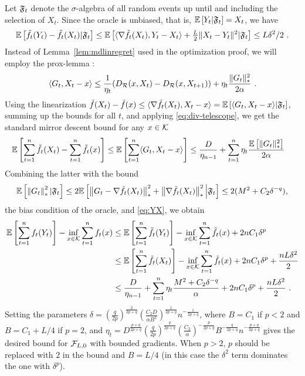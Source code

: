 Let $\mathfrak{F}_t$ denote the $\sigma$-algebra of all random events up until and including the selection of $X_t$. Since the oracle is unbiased, that is,  $\mathbb{E}\left[Y_t|\mathfrak{F}_t\right]=X_t$, we have
\begin{equation}
\mathbb{E}\left[\tilde{f}_t(Y_t)-\tilde{f}_t(X_t)|\mathfrak{F}_t\right] \le \mathbb{E}\left[\langle \nabla \tilde{f}_t(X_t),Y_t-X_t \rangle+\tfrac{L}{2}\|X_t-Y_t\|^2|\mathfrak{F}_t\right] \le L\delta^2/2~.
\label{eq:YX}
\end{equation}
Instead of Lemma~\ref{lem:mdlinregret} used in the optimization proof, we will employ the prox-lemma \citep[see, e.g.,][]{Beck2003mirror, NeJuLaSh09}:
\begin{equation}
\label{eq:proxlemma}
\langle G_t,X_t-x \rangle \le \frac{1}{\eta_t}(D_{\mathcal{R}}(x,X_t)-D_{\mathcal{R}}(x,X_{t+1})) + \eta_t \frac{\|G_t\|_*^2}{2\alpha}~.
\end{equation}
Using the linearization $\tilde{f}(X_t) - \tilde{f}(x) \le \langle \nabla \tilde{f}_t(X_t),X_t-x \rangle = \mathbb{E}\left[\langle  G_t,X_t-x \rangle| \mathfrak{F}_t\right]$, summing up the bounds for all $t$, and applying \eqref{eq:div-telescope}, we get the standard mirror descent bound for any $x \in \mathcal{K}$
\begin{align}
\mathbb{E}\left[\sum_{t=1}^n \tilde{f}_t(X_t)- \sum_{t=1}^n \tilde{f}_t(x)\right] 
& \le \mathbb{E}\left[\sum_{t=1}^n \langle G_t,X_t-x \rangle\right] 
\le \frac{D}{\eta_{n-1}} + \sum_{t=1}^n \eta_t \frac{\mathbb{E}\left[\|G_t\|_*^2\right]}{2\alpha} 
\label{eq:md-bound}
\end{align}
Combining the latter with the bound
\[
\mathbb{E}\left[\left\|G_t\right\|_*^2 | \mathfrak{F}_t\right] \le 2\mathbb{E}\left[\left\|G_t - \nabla \tilde{f}_t(X_t)\right\|_*^2 + \left\|\nabla \tilde{f}_t(X_t)\right\|_*^2 \Big| \mathfrak{F}_t\right]
\le 2(M^2 + C_2 \delta^{-q}),
\]
the bias condition of the oracle, and \eqref{eq:YX}, we obtain
\begin{align*}
\mathbb{E}\left[\sum_{t=1}^n f_t(Y_t)\right] - \inf_{x \in \mathcal{K}} \sum_{t=1}^n f_t(x)
& \le \mathbb{E}\left[\sum_{t=1}^n \tilde{f}_t(Y_t) \right]- \inf_{x \in \mathcal{K}} \sum_{t=1}^n \tilde{f}_t(x) + 2 n C_1 \delta^{p} \\
& \le \mathbb{E}\left[\sum_{t=1}^n \tilde{f}_t(X_t)\right] - \inf_{x \in \mathcal{K}} \sum_{t=1}^n \tilde{f}_t(x) + 2 n C_1 \delta^{p} + \frac{n L \delta^2}{2} \\
& \le \frac{D}{\eta_{n-1}}  + \sum_{t=1}^n \eta_t \frac{M^2 + C_2 \delta^{-q}}{\alpha} +  2 n C_1 \delta^{p} + \frac{n L \delta^2}{2}~.
\end{align*}
Setting the parameters 
$\delta=(\frac{q}{2p})^{\frac{2}{2p+q}} (\frac{C_2 D}{\alpha B^2})^{\frac{1}{2p+q}} n^{-\frac{1}{2p+q}}$, 
where $B=C_1$ if $p<2$ and $B=C_1+L/4$ if $p=2$, and 
$\eta_t=D^{\frac{p+q}{2p+q}} (\frac{q}{2p})^{\frac{q}{2p+q}} (\frac{C_2}{\alpha})^{-\frac{p}{2p+q}} B^{-\frac{q}{2p+q}} n^{-\frac{p+q}{2p+q}}$ gives the desired bound for $\mathcal{F}_{L,0}$ with bounded gradients. When $p>2$, $p$ should be replaced with $2$ in the bound and $B=L/4$ (in this case the $\delta^2$ term dominates the one with $\delta^p$).


